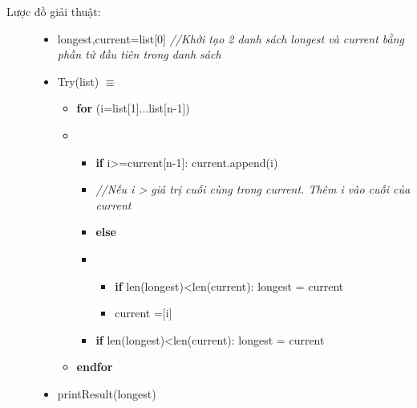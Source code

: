 \begin{enumerate}
\begin{description}
        \item[Lược đồ giải thuật:] 
        \item[] 
        \begin{itemize}
            \item [] longest,current=list[0] \textit{//Khởi tạo 2 danh sách longest và current bằng phần tử đầu tiên trong danh sách}
            \item [] Try(list) $\equiv$
                \begin{itemize}
                    \item [] \textbf{for} (i=list[1]...list[n-1])
                    \item []
                        \begin{itemize}
                            \item[] \textbf{if} i>=current[n-1]: current.append(i) 
                            \item[]\textit{//Nếu i > giá trị cuối cùng trong current. Thêm i vào cuối của current}
                            \item[] \textbf{else}
                            \item[] 
                            \begin{itemize}
                                \item [] \textbf{if} len(longest)<len(current): longest = current
                                \item [] current =[i]
                            \end{itemize}
                            \item [] \textbf{if} len(longest)<len(current): longest = current
                        \end{itemize}
                        \item [] \textbf{endfor}
                \end{itemize}
                
            \item [] printResult(longest)
        \end{itemize}
    \end{description}



\end{enumerate}
